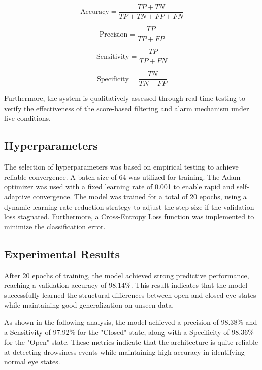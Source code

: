 \documentclass[10pt,twocolumn,letterpaper]{article}
\begin{document}
\begin{equation}
\text{Accuracy} = \frac{TP + TN}{TP + TN + FP + FN}
\end{equation}

\begin{equation}
\text{Precision} = \frac{TP}{TP + FP}
\end{equation}

\begin{equation}
\text{Sensitivity} = \frac{TP}{TP + FN}
\end{equation}

\begin{equation}
\text{Specificity} = \frac{TN}{TN + FP}
\end{equation}

Furthermore, the system is qualitatively assessed through real-time testing to verify the effectiveness of the score-based filtering and alarm mechanism under live conditions.

\subsection{Hyperparameters}

The selection of hyperparameters was based on empirical testing to achieve reliable convergence. A batch size of 64 was utilized for training. The Adam optimizer was used with a fixed learning rate of 0.001 to enable rapid and self-adaptive convergence. The model was trained for a total of 20 epochs, using a dynamic learning rate reduction strategy to adjust the step size if the validation loss stagnated. Furthermore, a Cross-Entropy Loss function was implemented to minimize the classification error. 

\subsection{Experimental Results}

After 20 epochs of training, the model achieved strong predictive performance, reaching a validation accuracy of 98.14\%. This result indicates that the model successfully learned the structural differences between open and closed eye states while maintaining good generalization on unseen data.

As shown in the following analysis, the model achieved a precision of 98.38\% and a Sensitivity of 97.92\% for the "Closed" state, along with a Specificity of 98.36\% for the "Open" state. These metrics indicate that the architecture is quite reliable at detecting drowsiness events while maintaining high accuracy in identifying normal eye states.
\end{document}
